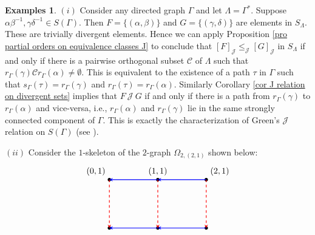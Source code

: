 \documentclass[a4paper,reqno,11pt]{amsart}
\numberwithin{equation}{section}
\theoremstyle{definition}
\newtheorem{examples}[thm]{Examples}
\theoremstyle{remark}
\begin{document}
\begin{examples}\label{ex illustrating J characterization}
$(i)$ Consider any directed graph $\Gamma$ and let $\Lambda=\Gamma^*$. Suppose $\alpha\beta^{-1},\gamma\delta^{-1}\in S(\Gamma)$. Then $F=\{(\alpha,\beta)\}$ and $G=\{(\gamma,\delta)\}$ are elements in $S_\Lambda$. These are trivially divergent elements. Hence we can apply Proposition \ref{pro partial orders on equivalence classes J} to conclude that $[F]_{\mathscr{J}}\le_{\mathscr{J}} [G]_{\mathscr{J}}$ in $S_\Lambda$ if and only if there is a pairwise orthogonal subset $\mathcal{C}$ of $\Lambda$ such that $r_\Gamma(\gamma)\mathcal{C}r_\Gamma(\alpha)\neq \emptyset$. This is equivalent to the existence of a path $\tau$ in $\Gamma$ such that $s_\Gamma(\tau)=r_\Gamma(\gamma)$ and $r_\Gamma(\tau)=r_\Gamma(\alpha)$. Similarly Corollary \ref{cor J relation on divergent sets} implies that $F~\mathscr{J}~G$ if and only if there is a path from $r_\Gamma(\gamma)$ to $r_\Gamma(\alpha)$ and vice-versa, i.e., $r_\Gamma(\alpha)$ and $r_\Gamma(\gamma)$ lie in the same strongly connected component of $\Gamma$. This is exactly the characterization of Green's $\mathscr{J}$ relation on $S(\Gamma)$ (see \cite[Corollary 2(3)]{Mesyan}). 

$(ii)$ Consider the $1$-skeleton of the $2$-graph $\Omega_{2,(2,1)}$ shown below: 
\[
\begin{tikzpicture}[
    >=stealth,
    thick,
    every node/.style={font=\large}
]

\coordinate (A) at (0,2);
\coordinate (B) at (2,2);
\coordinate (C) at (4,2);

\coordinate (D) at (0,0);
\coordinate (E) at (2,0);
\coordinate (F) at (4,0);

\fill (A) circle (2pt);
\fill (B) circle (2pt);
\fill (C) circle (2pt);

\fill (D) circle (2pt);
\fill (E) circle (2pt);
\fill (F) circle (2pt);

\draw[blue, thick, ->] (C) -- (B);
\draw[blue, thick, ->] (B) -- (A);

\draw[blue, thick, ->] (F) -- (E);
\draw[blue, thick, ->] (E) -- (D);

\draw[red, thick, dashed, ->] (A) -- (D);
\draw[red, thick, dashed, ->] (B) -- (E);
\draw[red, thick, dashed, ->] (C) -- (F);

\node[above left=1pt] at (A) {\normalsize{$(0,1)$}};
\node[above=1pt]      at (B) {\normalsize{$(1,1)$}};
\node[above right=1pt] at (C) {\normalsize{$(2,1)$}};


\end{tikzpicture}\]
\end{examples}
\end{document}
